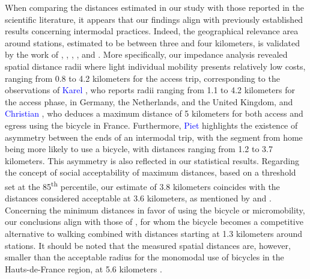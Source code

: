 \begin{refsegment}
When comparing the distances estimated in our study with those reported in the scientific literature, it appears that our findings align with previously established results concerning intermodal practices. Indeed, the geographical relevance area around stations, estimated to be between three and four kilometers, is validated by the work of \textcolor{blue}{\textcite[234]{keijer_how_2000}}, \textcolor{blue}{\textcite[359]{givoni_access_2007}}, \textcolor{blue}{\textcite[23]{debrezion_modelling_2009}}, \textcolor{blue}{\textcite[213]{kager_characterisation_2016}}, and \textcolor{blue}{\textcite[42]{nielsen_bikeability_2018}}. More specifically, our impedance analysis revealed spatial distance radii where light individual mobility presents relatively low costs, ranging from 0.8 to 4.2 kilometers for the access trip, corresponding to the observations of \textcolor{blue}{Karel} \textcolor{blue}{\textcite[282]{martens_bicycle_2004}}, who reports radii ranging from 1.1 to 4.2 kilometers for the access phase, in Germany, the Netherlands, and the United Kingdom, and \textcolor{blue}{Christian} \textcolor{blue}{\textcite[14]{gioria_etude_2016}}, who deduces a maximum distance of 5 kilometers for both access and egress using the bicycle in France. Furthermore, \textcolor{blue}{Piet} \textcolor{blue}{\textcite[73]{rietveld_accessibility_2000}} highlights the existence of asymmetry between the ends of an intermodal trip, with the segment from home being more likely to use a bicycle, with distances ranging from 1.2 to 3.7 kilometers. This asymmetry is also reflected in our statistical results. Regarding the concept of social acceptability of maximum distances, based on a threshold set at the 85\textsuperscript{th} percentile, our estimate of 3.8 kilometers coincides with the distances considered acceptable at 3.6 kilometers, as mentioned by \textcolor{blue}{\textcite[62]{rabaud_quand_2022}} and \textcolor{blue}{\textcite[45]{la_paix_puello_modelling_2015}}. Concerning the minimum distances in favor of using the bicycle or micromobility, our conclusions align with those of \textcolor{blue}{\textcite[2]{rastogi_willingness_2010}}, for whom the bicycle becomes a competitive alternative to walking combined with distances starting at 1.3 kilometers around stations. It should be noted that the measured spatial distances are, however, smaller than the acceptable radius for the monomodal use of bicycles in the Hauts-de-France region, at 5.6 kilometers \textcolor{blue}{\autocite[20]{hasiak_estimation_2023}}.%


\end{refsegment}
